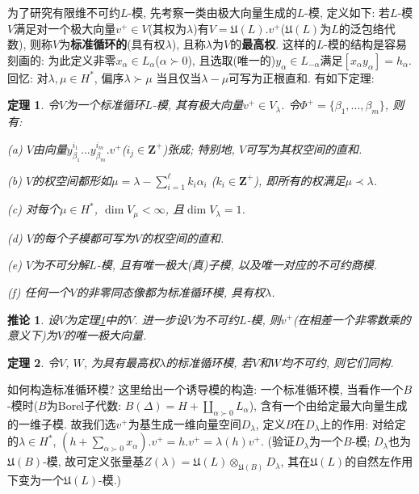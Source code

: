 \documentclass{ctexart}%
\newtheorem{theorem}{定理}
\newtheorem{corollary}{推论}
\theoremstyle{definition}
\theoremstyle{remark}
\begin{document}
为了研究有限维不可约$L$-模, 先考察一类由极大向量生成的$L$-模, 定义如下: 若$L$-模$V$满足对一个极大向量$v^+\in V$(其权为$\lambda$)有$V=\mathfrak{U}(L).v^+$($\mathfrak{U}(L)$为$L$的泛包络代数), 则称$V$为\textbf{标准循环的}(具有权$\lambda$), 且称$\lambda$为$V$的\textbf{最高权}. 这样的$L$-模的结构是容易刻画的: 为此定义非零$x_\alpha \in L_\alpha$($\alpha\succ 0$), 且选取(唯一的)$y_\alpha\in L_{-\alpha}$满足$[x_\alpha y_\alpha]=h_\alpha$. 回忆: 对$\lambda,\mu\in H^*$, 偏序$\lambda\succ \mu$ 当且仅当$\lambda-\mu$可写为正根直和. 有如下定理:
\begin{theorem}\label{20.2} 令$V$为一个标准循环$L$-模, 其有极大向量$v^+\in V_\lambda$. 令$\Phi^+=\{\beta_1,...,\beta_m\}$, 则有:

(a) $V$由向量$y^{i_1}_{\beta_1}...y^{i_m}_{\beta_m}. v^+$($i_j\in \mathbf{Z}^+$)张成; 特别地, $V$可写为其权空间的直和.

(b) $V$的权空间都形如$\mu=\lambda - \sum_{i=1}^{\ell} k_i\alpha_i$ ($k_i\in \mathbf{Z}^+$), 即所有的权满足$\mu \prec \lambda$.

(c) 对每个$\mu\in H^*$, $\dim V_\mu<\infty$, 且$\dim V_\lambda = 1$.

(d) $V$的每个子模都可写为$V$的权空间的直和.

(e) $V$为不可分解$L$-模, 且有唯一极大(真)子模, 以及唯一对应的不可约商模.

(f) 任何一个$V$的非零同态像都为标准循环模, 具有权$\lambda$.
\end{theorem}

\begin{corollary} 设$V$为定理\ref{20.2}中的$V$. 进一步设$V$为不可约$L$-模, 则$v^+$(在相差一个非零数乘的意义下)为$V$的唯一极大向量.
\end{corollary}

\begin{theorem}\label{20.3A} 令$V$, $W$, 为具有最高权$\lambda$的标准循环模, 若$V$和$W$均不可约, 则它们同构.
\end{theorem}

如何构造标准循环模? 这里给出一个诱导模的构造: 一个标准循环模, 当看作一个$B$-模时($B$为Borel子代数: $B(\Delta) = H+\coprod_{\alpha \succ 0} L_\alpha$), 含有一个由给定最大向量生成的一维子模. 故我们选$v^+$为基生成一维向量空间$D_\lambda$,  定义$B$在$D_\lambda$上的作用: 对给定的$\lambda\in H^*$, $(h+\sum_{\alpha \succ 0} x_\alpha).v^+ = h.v^+=\lambda(h) v^+$. (验证$D_\lambda$为一个$B$-模; $D_\lambda$也为$\mathfrak{U}(B)$-模, 故可定义张量基$Z(\lambda) = \mathfrak{U}(L)\otimes_{\mathfrak{U}(B)}D_\lambda$, 其在$\mathfrak{U}(L)$的自然左作用下变为一个$\mathfrak{U}(L)$-模.)
\end{document}
